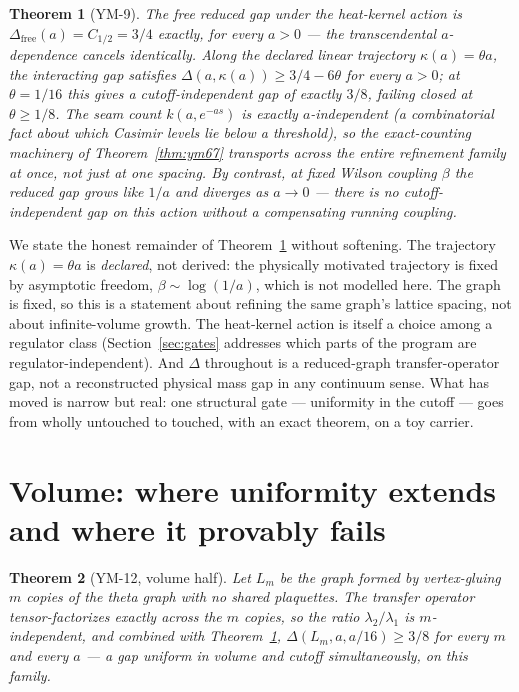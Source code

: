 \documentclass[aps,prd,twocolumn,superscriptaddress,nofootinbib]{revtex4-2}
\newtheorem{theorem}{Theorem}
\begin{document}
\begin{theorem}[YM-9]\label{thm:ym9}
The free reduced gap under the heat-kernel action is
$\Delta_{\mathrm{free}}(a) = C_{1/2} = 3/4$ exactly, for every $a>0$ ---
the transcendental $a$-dependence cancels identically. Along the
declared linear trajectory $\kappa(a)=\theta a$, the interacting gap
satisfies $\Delta(a,\kappa(a))\ge 3/4-6\theta$ for every $a>0$; at
$\theta=1/16$ this gives a cutoff-independent gap of exactly $3/8$,
failing closed at $\theta\ge1/8$. The seam count
$k(a,e^{-as})$ is exactly $a$-independent (a combinatorial fact about
which Casimir levels lie below a threshold), so the exact-counting
machinery of Theorem~\ref{thm:ym67} transports across the entire
refinement family at once, not just at one spacing. By contrast, at
fixed Wilson coupling $\beta$ the reduced gap grows like $1/a$ and
diverges as $a\to0$ --- there is no cutoff-independent gap on this action
without a compensating running coupling.
\end{theorem}

We state the honest remainder of Theorem~\ref{thm:ym9} without
softening. The trajectory $\kappa(a)=\theta a$ is \emph{declared}, not
derived: the physically motivated trajectory is fixed by asymptotic
freedom, $\beta\sim\log(1/a)$, which is not modelled here. The graph is
fixed, so this is a statement about refining the same graph's lattice
spacing, not about infinite-volume growth. The heat-kernel action is
itself a choice among a regulator class (Section~\ref{sec:gates}
addresses which parts of the program are regulator-independent). And
$\Delta$ throughout is a reduced-graph transfer-operator gap, not a
reconstructed physical mass gap in any continuum sense. What has moved is
narrow but real: one structural gate --- uniformity in the cutoff ---
goes from wholly untouched to touched, with an exact theorem, on a toy
carrier.

\section{Volume: where uniformity extends and where it provably fails}\label{sec:volume}

\begin{theorem}[YM-12, volume half]\label{thm:ym12}
Let $L_m$ be the graph formed by vertex-gluing $m$ copies of the theta
graph with \emph{no shared plaquettes}. The transfer operator
tensor-factorizes exactly across the $m$ copies, so the ratio
$\lambda_2/\lambda_1$ is $m$-independent, and combined with
Theorem~\ref{thm:ym9}, $\Delta(L_m,a,a/16)\ge3/8$ for \emph{every} $m$
and \emph{every} $a$ --- a gap uniform in volume and cutoff
simultaneously, on this family.
\end{theorem}
\end{document}
